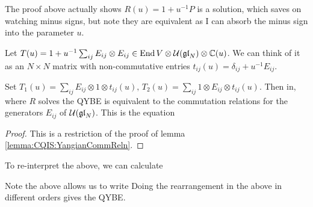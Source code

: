 \documentclass{article}
\begin{document}
\begin{remark}
The proof above actually shows $R(u) = 1 + u^{-1} P$ is a solution, which saves on watching minus signs, but note they are equivalent as I can absorb the minus sign into the parameter $u$.
\end{remark}


Let $T(u) = 1 + u^{-1}\sum_{ij} E_{ij} \otimes E_{ij} \in \operatorname{End} V \otimes \mathcal{U}(\mathfrak{gl}_N) \otimes \mathbb{C}(u)$. We can think of it as an $N \times N$ matrix with non-commutative entries $t_{ij}(u) = \delta_{ij} + u^{-1}E_{ij}$. 

\begin{prop}
Set $T_1(u) = \sum_{ij}E_{ij} \otimes 1 \otimes t_{ij}(u), \, T_2(u) = \sum_{ij} 1 \otimes E_{ij} \otimes t_{ij}(u)$. Then 
 in, where $R$ solves the QYBE is equivalent to the commutation relations for the generators $E_{ij}$ of $\mathcal{U}(\mathfrak{gl}_N)$. This is the  equation 
\end{prop}
\begin{proof}
This is a restriction of the proof of lemma \ref{lemma:CQIS:YangianCommReln}. 
\end{proof}
To re-interpret the above, we can calculate


Note the above allows us to write 
Doing the rearrangement in the above in different orders gives the QYBE. 
\end{document}
